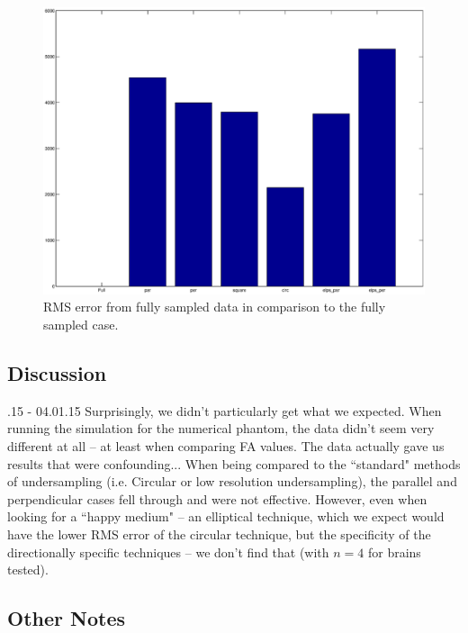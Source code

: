 \documentclass[11 pt]{article}
\begin{document}
      \begin{figure}[h]
        \centering
        \vspace{0pt}
        \setlength\fboxsep{0pt}
        \setlength\fboxrule{0.5pt}
        \includegraphics[trim = {10mm 0mm 10mm 0mm},clip,scale = 0.4] {Figs/numericalSims/brainRMS.eps}
        \caption{RMS error from fully sampled data in comparison to the fully sampled case.}
        \label{fig:RMSBrain}

        \end{figure}
    
  
  \subsection{Discussion}
  
    .15 - 04.01.15
    Surprisingly, we didn't particularly get what we expected. When running the simulation for the numerical phantom, the data didn't seem very different at all -- at least when comparing FA values. The data actually gave us results that were confounding... When being compared to the ``standard" methods of undersampling (i.e. Circular or low resolution undersampling), the parallel and perpendicular cases fell through and were not effective. However, even when looking for a ``happy medium" -- an elliptical technique, which we expect would have the lower RMS error of the circular technique, but the specificity of the directionally specific techniques -- we don't find that (with $n = 4$ for brains tested).
  
  
  \subsection{Other Notes}
  
\end{document}
